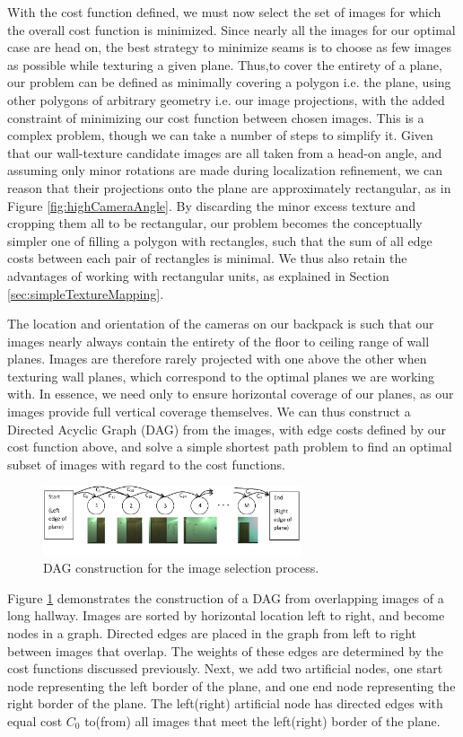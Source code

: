\documentclass[10pt,twocolumn,letterpaper]{article}
\begin{document}
With the cost function defined, we must now select the set of images
for which the overall cost function is minimized. Since nearly all the
images for our optimal case are head on, the best strategy to minimize
seams is to choose as few images as possible while texturing a given
plane. Thus,to cover the entirety of a plane, our problem can be
defined as minimally covering a polygon i.e. the plane, using other
polygons of arbitrary geometry i.e. our image projections, with the
added constraint of minimizing our cost function between chosen
images.  This is a complex problem, though we can take a number of
steps to simplify it. Given that our wall-texture candidate images are
all taken from a head-on angle, and assuming only minor rotations are
made during localization refinement, we can reason that their
projections onto the plane are approximately rectangular, as in Figure
\ref{fig:highCameraAngle}. By discarding the minor excess texture and
cropping them all to be rectangular, our problem becomes the
conceptually simpler one of filling a polygon with rectangles, such
that the sum of all edge costs between each pair of rectangles is
minimal. We thus also retain the advantages of working with
rectangular units, as explained in Section
\ref{sec:simpleTextureMapping}.

The location and orientation of the cameras on our backpack is such
that our images nearly always contain the entirety of the floor to
ceiling range of wall planes. Images are therefore rarely projected
with one above the other when texturing wall planes, which correspond
to the optimal planes we are working with.  In essence, we need only
to ensure horizontal coverage of our planes, as our images provide
full vertical coverage themselves. We can thus construct a Directed
Acyclic Graph (DAG) from the images, with edge costs defined by our
cost function above, and solve a simple shortest path problem to find
an optimal subset of images with regard to the cost functions.

\begin{figure}
  \centering
  \includegraphics[width=3in]{dagCreation.pdf}
  \caption{DAG construction for the image selection process.}
  \label{fig:dagCreation}
\end{figure}

Figure \ref{fig:dagCreation} demonstrates the construction of a DAG
from overlapping images of a long hallway. Images are sorted by
horizontal location left to right, and become nodes in a
graph. Directed edges are placed in the graph from left to right
between images that overlap. The weights of these edges are determined
by the cost functions discussed previously. Next, we add two
artificial nodes, one start node representing the left border of the
plane, and one end node representing the right border of the
plane. The left(right) artificial node has directed edges with equal
cost $C_0$ to(from) all images that meet the left(right) border of the
plane.
\end{document}

